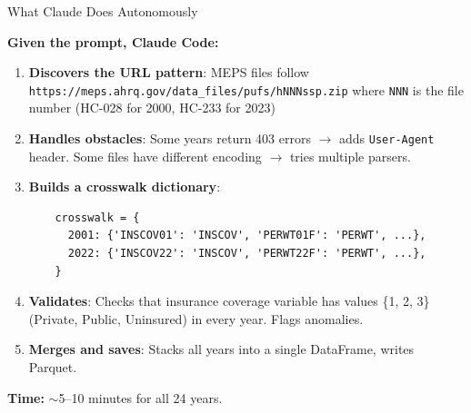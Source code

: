 \documentclass[10pt,english,aspectratio=169]{beamer}
\begin{document}
\begin{frame}[fragile]{What Claude Does Autonomously}

\textbf{Given the prompt, Claude Code:}

\vspace{0.2cm}
\begin{enumerate}
    \item \textbf{Discovers the URL pattern}: MEPS files follow \texttt{https://meps.ahrq.gov/data\_files/pufs/hNNNssp.zip} where \texttt{NNN} is the file number (HC-028 for 2000, HC-233 for 2023)

    \vspace{0.1cm}
    \item \textbf{Handles obstacles}: Some years return 403 errors $\to$ adds \texttt{User-Agent} header. Some files have different encoding $\to$ tries multiple parsers.

    \vspace{0.1cm}
    \item \textbf{Builds a crosswalk dictionary}:
    \begin{small}
    \begin{verbatim}
    crosswalk = {
      2001: {'INSCOV01': 'INSCOV', 'PERWT01F': 'PERWT', ...},
      2022: {'INSCOV22': 'INSCOV', 'PERWT22F': 'PERWT', ...},
    }
    \end{verbatim}
    \end{small}

    \vspace{0.1cm}
    \item \textbf{Validates}: Checks that insurance coverage variable has values \{1, 2, 3\} (Private, Public, Uninsured) in every year. Flags anomalies.

    \vspace{0.1cm}
    \item \textbf{Merges and saves}: Stacks all years into a single DataFrame, writes Parquet.
\end{enumerate}

\vspace{0.2cm}
\textbf{Time:} $\sim$5--10 minutes for all 24 years.

\end{frame}
\end{document}
